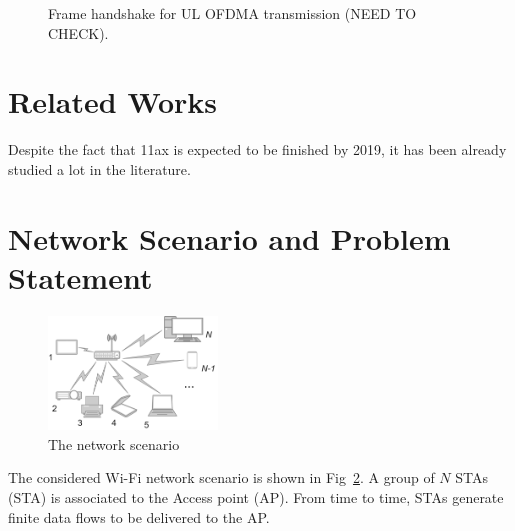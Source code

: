 \begin{figure}[t]
{}
	\caption{\label{fig:transmission} Frame handshake for UL OFDMA transmission (NEED TO CHECK).}
	\vspace{-0.5em}
\end{figure}

\section{Related Works}
\label{sec:related}
Despite the fact that 11ax is expected to be finished by 2019, it has been already studied a lot in the literature.



\section{Network Scenario and Problem Statement}
\label{sec:scenario}

\begin{figure}[t]
	\includegraphics[width = 0.4\textwidth]{NetworkScenario}
	\caption{\label{fig:scenario} The network scenario}
\end{figure}

The considered Wi-Fi network scenario is shown in Fig~\ref{fig:scenario}. A group of $N$ STAs (STA) is associated to the Access point (AP). 
From time to time, STAs generate finite data flows to be delivered to the AP.

